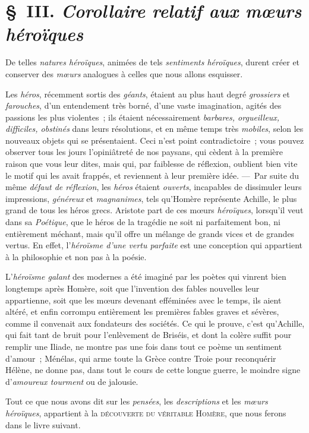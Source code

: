 \documentclass[french,twoside]{book} %
\newcommand\chapterclose{} %
\begin{document}
\section[{§ III. Corollaire relatif aux mœurs héroïques}]{§ III. {\itshape Corollaire relatif aux mœurs héroïques}}
\noindent De telles {\itshape natures héroïques}, animées de tels {\itshape sentiments héroïques}, durent créer et conserver des {\itshape mœurs} analogues à celles que nous allons esquisser.\par
 Les {\itshape héros}, récemment sortis des {\itshape géants}, étaient au plus haut degré {\itshape grossiers} et {\itshape farouches}, d’un entendement très borné, d’une vaste imagination, agités des passions les plus violentes ; ils étaient nécessairement {\itshape barbares, orgueilleux, difficiles, obstinés} dans leurs résolutions, et en même temps très {\itshape mobiles}, selon les nouveaux objets qui se présentaient. Ceci n’est point contradictoire ; vous pouvez observer tous les jours l’opiniâtreté de nos paysans, qui cèdent à la première raison que vous leur dites, mais qui, par faiblesse de réflexion, oublient bien vite le motif qui les avait frappés, et reviennent à leur première idée. — Par suite du même {\itshape défaut de réflexion}, les {\itshape héros} étaient {\itshape ouverts}, incapables de dissimuler leurs impressions, {\itshape généreux} et {\itshape magnanimes}, tels qu’Homère représente Achille, le plus grand de tous les héros grecs. Aristote part de ces mœurs {\itshape héroïques}, lorsqu’il veut dans sa {\itshape Poétique}, que le héros de la tragédie ne soit ni parfaitement bon, ni entièrement méchant, mais qu’il offre un mélange de grands vices et de grandes vertus. En effet, l’{\itshape héroïsme d’une vertu parfaite} est une conception qui appartient à la philosophie et non pas à la poésie.\par
L’{\itshape héroïsme galant} des modernes a été imaginé par les poètes qui vinrent bien longtemps après Homère, soit que l’invention des fables nouvelles leur appartienne, soit que les mœurs devenant efféminées avec le temps, ils aient altéré, et enfin corrompu entièrement les premières fables graves et sévères, comme il convenait aux fondateurs des  sociétés. Ce qui le prouve, c’est qu’Achille, qui fait tant de bruit pour l’enlèvement de Briséis, et dont la colère suffit pour remplir une Iliade, ne montre pas une fois dans tout ce poème un sentiment d’amour ; Ménélas, qui arme toute la Grèce contre Troie pour reconquérir Hélène, ne donne pas, dans tout le cours de cette longue guerre, le moindre signe d’{\itshape amoureux tourment} ou de jalousie.\par
Tout ce que nous avons dit sur les {\itshape pensées}, les {\itshape descriptions} et les {\itshape mœurs héroïques}, appartient à la {\scshape découverte du véritable Homère}, que nous ferons dans le livre suivant.
\chapterclose
\end{document}
